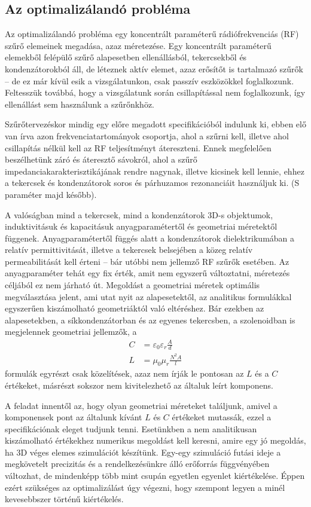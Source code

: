 	\subsection{Az optimalizálandó probléma}
		Az optimalizálandó probléma egy koncentrált paraméterű rádiófrekvenciás (RF) szűrő elemeinek megadása, azaz méretezése. Egy koncentrált paraméterű elemekből felépülő szűrő alapesetben ellenállásból, tekercsekből és kondenzátorokból áll, de léteznek aktív elemet, azaz erősítőt is tartalmazó szűrők -- de ez már kívül esik a vizsgálatunkon, csak passzív eszközökkel foglalkozunk. Feltesszük továbbá, hogy a vizsgálatunk során csillapítással nem foglalkozunk, így ellenállást sem használunk a szűrőnkhöz.
		
		Szűrőtervezéskor mindig egy előre megadott specifikációból indulunk ki, ebben elő van írva azon frekvenciatartományok csoportja, ahol a szűrni kell, illetve ahol csillapítás nélkül kell az RF teljesítményt átereszteni. Ennek megfelelően beszélhetünk záró és áteresztő sávokról, ahol a szűrő impedanciakarakterisztikájának rendre nagynak, illetve kicsinek kell lennie, ehhez a tekercsek és kondenzátorok soros és párhuzamos rezonanciáit használjuk ki. (S paraméter majd később).
		
		A valóságban mind a tekercsek, mind a kondenzátorok 3D-s objektumok, induktivitásuk és kapacitásuk anyagparamétertől és geometriai méretektől függenek. Anyagparamétertől függés alatt a kondenzátorok dielektrikumában a relatív permittivitását, illetve a tekercsek belsejében a közeg relatív permeabilitását kell érteni -- bár utóbbi nem jellemző RF szűrők esetében. Az anyagparaméter tehát egy fix érték, amit nem egyszerű változtatni, méretezés céljából ez nem járható út. Megoldást a geometriai méretek optimális megválasztása jelent, ami utat nyit az alapesetektől, az analitikus formulákkal egyszerűen kiszámolható geometriáktól való eltéréshez. Bár ezekben az alapesetekben, a síkkondenzátorban és az egyenes tekercsben, a szolenoidban is megjelennek geometriai jellemzők, a
\begin{align*}
	C &= \varepsilon_{0}\varepsilon_{r}\frac{A}{d}\\
	L &= \mu_{0}\mu_{r}\frac{N^{2}A}{l}
\end{align*}
formulák egyrészt csak közelítések, azaz nem írják le pontosan az $L$ és a $C$ értékeket, másrészt sokszor nem kivitelezhető az általuk leírt komponens.
		
		A feladat innentől az, hogy olyan geometriai méreteket találjunk, amivel a komponensek pont az általunk kívánt $L$ és $C$ értékeket mutassák, ezzel a specifikációnak eleget tudjunk tenni. Esetünkben a nem analitikusan kiszámolható értékekhez numerikus megoldást kell keresni, amire egy jó megoldás, ha 3D véges elemes szimulációt készítünk. Egy-egy szimuláció futási ideje a megkövetelt precizitás és a rendelkezésünkre álló erőforrás függvényében változhat, de mindenképp több mint csupán egyetlen egyenlet kiértékelése. Éppen ezért szükséges az optimalizálást úgy végezni, hogy szempont legyen a minél kevesebbszer történű kiértékelés. 
		
